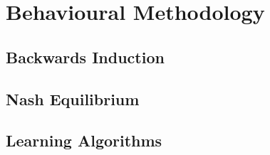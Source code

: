 \section{Behavioural Methodology}

\subsection{Backwards Induction}

\subsection{Nash Equilibrium}

\subsection{Learning Algorithms}